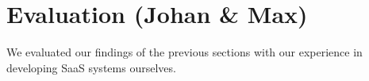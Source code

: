 \section{Evaluation (Johan & Max)}

We evaluated our findings of the previous sections with our experience in developing SaaS systems ourselves.
